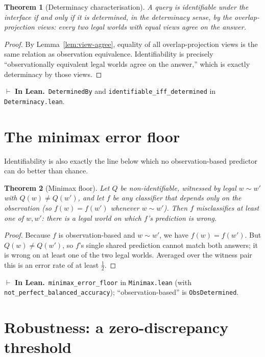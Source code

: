 \documentclass[11pt]{article}
\newcommand{\lean}[1]{\texttt{#1}}           %
\theoremstyle{plain}
\newtheorem{theorem}{Theorem}
\theoremstyle{definition}
\newcommand{\inlean}[1]{\par\smallskip\noindent%
  {\small\textcolor{blue!50!black}{$\vdash$ \textbf{In Lean.}}~#1}\par\smallskip}
\begin{document}
\begin{theorem}[Determinacy characterisation]\label{thm:det}
A query is identifiable under the interface if and only if it is determined, in the
determinacy sense, by the overlap-projection views: every two legal worlds with equal views
agree on the answer.
\end{theorem}
\begin{proof}
By Lemma~\ref{lem:view-agree}, equality of all overlap-projection views is the same relation
as observation equivalence. Identifiability is precisely ``observationally equivalent legal
worlds agree on the answer,'' which is exactly determinacy by those views.
\end{proof}
\inlean{\lean{DeterminedBy} and \lean{identifiable\_iff\_determined} in
\lean{Determinacy.lean}.}

\section{The minimax error floor}\label{sec:minimax}

Identifiability is also exactly the line below which no observation-based predictor can do
better than chance.

\begin{theorem}[Minimax floor]\label{thm:minimax}
Let $Q$ be \emph{non}-identifiable, witnessed by legal $w\sim w'$ with $Q(w)\neq Q(w')$, and
let $f$ be any classifier that depends only on the observation (so $f(w)=f(w')$ whenever
$w\sim w'$). Then $f$ misclassifies at least one of $w,w'$: there is a legal world on which
$f$'s prediction is wrong.
\end{theorem}
\begin{proof}
Because $f$ is observation-based and $w\sim w'$, we have $f(w)=f(w')$. But $Q(w)\neq Q(w')$,
so $f$'s single shared prediction cannot match both answers; it is wrong on at least one of
the two legal worlds. Averaged over the witness pair this is an error rate of at least
$\tfrac12$.
\end{proof}
\inlean{\lean{minimax\_error\_floor} in \lean{Minimax.lean} (with
\lean{not\_perfect\_balanced\_accuracy}); ``observation-based'' is \lean{ObsDetermined}.}

\section{Robustness: a zero-discrepancy threshold}\label{sec:robust}
\end{document}
